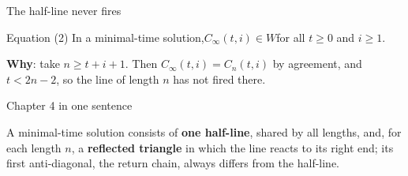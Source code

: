 \begin{frame}{The half-line never fires}
\vspace{2ex}
\begin{statement}{Equation (2)}
In a minimal-time solution,\qquad $C_\infty(t,i)\in W$\quad for all $t\ge0$ and $i\ge1$.
\end{statement}
\vspace{2ex}
\textbf{Why}: take $n\ge t+i+1$. Then $C_\infty(t,i)=C_n(t,i)$ by agreement, and $t<2n-2$, so the line of length $n$ has not fired there.
\end{frame}

\begin{frame}{Chapter 4 in one sentence}
\vspace{4ex}
\begin{plainbox}\large
A minimal-time solution consists of \textbf{one half-line}, shared by all lengths, and, for each length $n$, a \textbf{reflected triangle} in which the line reacts to its right end; its first anti-diagonal, the return chain, always differs from the half-line.
\end{plainbox}
\end{frame}
